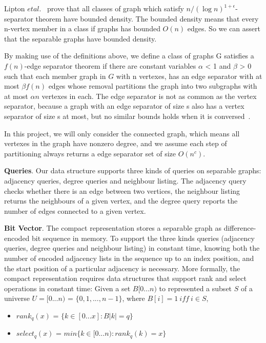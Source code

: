 \documentclass[12pt,glossary]{dalthesis}
\begin{document}
Lipton $et al$.~\cite{Nested-Dissection} prove that all classes of graph which satisfy $n/(\log n )^{1+\epsilon}$-separator theorem have bounded density. The bounded density means that every n-vertex member in a class if graphs has bounded $O(n)$ edges. So we can assert that the separable graphs have bounded density.

By making use of the definitions above, we define a class of graphs G satisfies a $f(n)$-edge separator theorem if there are constant variables $\alpha$ < 1 and $\beta$ > 0 such that each member graph in $G$ with n vertexes, has an edge separator with at most $\beta f(n)$ edges whose removal partitions the graph into two subgraphs with at most $\alpha n$ vertexes in each. The edge separator is not as common as the vertex separator, because a graph with an edge separator of size s also has a vertex separator of size s at most, but no similar bounds holds when it is conversed~\cite{compact-representation}.

In this project, we will only consider the connected graph, which means all vertexes in the graph have nonzero degree, and we assume each step of partitioning always returns a edge separator set of size $O(n^{c})$.

\textbf{Queries}. Our data structure supports three kinds of queries on separable graphs: adjacency queries, degree queries and neighbour listing. The adjacency query checks whether there is an edge between two vertices, the neighbour listing returns the neighbours of a given vertex, and the degree query reports the number of edges connected to a given vertex.

\textbf{Bit Vector}. The compact representation stores a separable graph as difference-encoded bit sequence in memory. To support the three kinds queries (adjacency queries, degree queries and neighbour listing) in constant time, knowing both the number of encoded adjacency lists in the sequence up to an index position, and the start position of a particular adjacency is necessary. More formally, the compact representation requires data structures that support rank and select operations in constant time: Given a set $B[0...n)$ to represented a subset $S$ of a universe $U = [0...n)$ = $\{0,1,...,n-1 \}$, where $B[i] = 1 \ iff \ i \in S$,

\begin{itemize}[noitemsep]
\item $rank_{q}(x)$ = $\{k \in [0...x] : B|k| = q \}$
\item $select_{q}(x)$ = $ min \{ k \in [0...n) : rank_{q}(k) = x \} $ 
\end{itemize}
\end{document}
